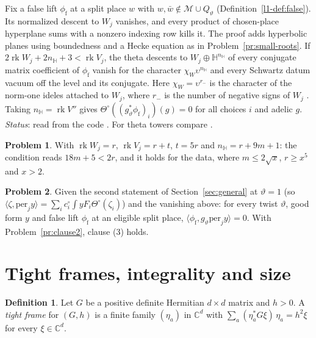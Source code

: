 \documentclass[reqno]{amsart}
\theoremstyle{definition}
\newtheorem{problem}{Problem}[section]
\newtheorem{definition}{Definition}[section]
\theoremstyle{plain}
\theoremstyle{remark}
\newcommand{\C}{{\mathbb{C}}}
\newcommand{\Mch}{{\mathcal{M}}}
\newcommand{\per}{\mathrm{per}}
\newcommand{\phif}{\phi_{\mathrm f}}
\newcommand{\vt}{\vartheta}
\begin{document}
Fix a false lift \(\phif\) at a split place \(w\) with \(w,\bar w\notin\Mch\cup Q_\vt\) (Definition~\ref{l1-def:false}).  Its normalized descent to \(W_j\) vanishes, and every product of chosen-place hyperplane sums with a nonzero indexing row kills it.  The proof adds hyperbolic planes using boundedness and a Hecke equation as in Problem~\ref{pr:small-roots}.  If \(2\operatorname{rk}W_j+2n_{\mathbb H}+3<\operatorname{rk}V_j\), the theta descents to \(W_j\oplus\mathbb H^{n_{\mathbb H}}\) of every conjugate matrix coefficient of \(\phif\) vanish for the character \(\chi_W\upsilon^{n_{\mathbb H}}\) and every Schwartz datum vacuum off the level and its conjugate.  Here \(\chi_W=\upsilon^{r_-}\) is the character of the norm-one ideles attached to \(W_j\), where \(r_-\) is the number of negative signs of \(W_j\) \cite[AuxiliaryPair, line 332]{GL}.  Taking \(n_{\mathbb H}=\operatorname{rk}V''\) gives \(\Theta^\circ((g_\vt^*\phif)_i)(g)=0\) for all choices \(i\) and adelic \(g\).  \emph{Status}: read from the code \cite[HyperbolicPlaneStep, lines 64, 437 and GluingMaps, lines 912--958]{GL}.  For theta towers compare \cite[Ch.~I, \S\S1--2]{Ra84}.

\begin{problem}\label{pr:tower-rank}
With \(\operatorname{rk}W_j = r\), \(\operatorname{rk}V_j = r+t\), \(t = 5r\) and \(n_{\mathbb H} = r+9m+1\): the condition reads \(18m+5<2r\), and it holds for the data, where \(m\le2\sqrt x\), \(r\ge x^5\) and \(x>2\).
\end{problem}

\begin{problem}\label{pr:clause3}
Given the second statement of Section~\ref{sec:general} at \(\vt = 1\) (so \(\langle\zeta,\per_jy\rangle = \sum_ic^\circ_i\int yF_i\Theta^\circ(\zeta_i)\)) and the vanishing above: for every twist \(\vt\), good form \(y\) and false lift \(\phif\) at an eligible split place, \(\langle\phif, g_\vt\per_jy\rangle = 0\).  With Problem~\ref{pr:clause2}, clause (3) holds.
\end{problem}

\section{Tight frames, integrality and size}\label{sec:frames}

\begin{definition}\label{def:frame}
Let \(G\) be a positive definite Hermitian \(d\times d\) matrix and \(h>0\).  A \emph{tight frame} for \((G,h)\) is a finite family \((\eta_a)\) in \(\C^d\) with \(\sum_a(\eta_a^*G\xi)\,\eta_a = h^2\xi\) for every \(\xi\in\C^d\).
\end{definition}
\end{document}
